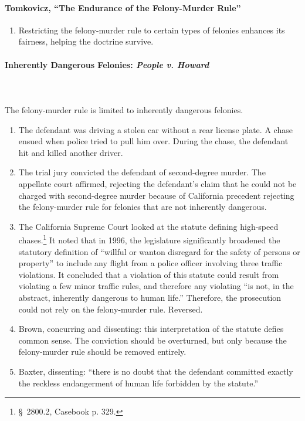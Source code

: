 \paragraph{Tomkovicz, ``The Endurance of the Felony-Murder Rule''}

\begin{enumerate}
    \item Restricting the felony-murder rule to certain types of felonies 
    enhances its fairness, helping the doctrine survive.
\end{enumerate}

\paragraph{Inherently Dangerous Felonies: \emph{People v. Howard}}
~\\\\
The felony-murder rule is limited to inherently dangerous felonies.

\begin{enumerate}
    \item The defendant was driving a stolen car without a rear license plate. 
    A chase ensued when police tried to pull him over. During the chase, the 
    defendant hit and killed another driver.
    \item The trial jury convicted the defendant of second-degree murder. The 
    appellate court affirmed, rejecting the defendant's claim that he could 
    not be charged with second-degree murder because of California precedent 
    rejecting the felony-murder rule for felonies that are not inherently 
    dangerous.
    \item The California Supreme Court looked at the statute defining 
    high-speed chases.\footnote{\S\ 2800.2, Casebook p. 329.} It noted 
    that in 1996, the legislature significantly broadened the statutory 
    definition of ``willful or wanton disregard for the safety of persons or 
    property'' to include any flight from a police officer involving three 
    traffic violations. It concluded that a violation of this statute could 
    result from violating a few minor traffic rules, and therefore any 
    violating ``is not, in the abstract, inherently dangerous to human life.'' 
    Therefore, the prosecution could not rely on the felony-murder rule. 
    Reversed.
    \item Brown, concurring and dissenting: this interpretation of the statute 
    defies common sense. The conviction should be overturned, but only because 
    the felony-murder rule should be removed entirely.
    \item Baxter, dissenting: ``there is no doubt that the defendant committed 
    exactly the reckless endangerment of human life forbidden by the 
    statute.''
\end{enumerate}

